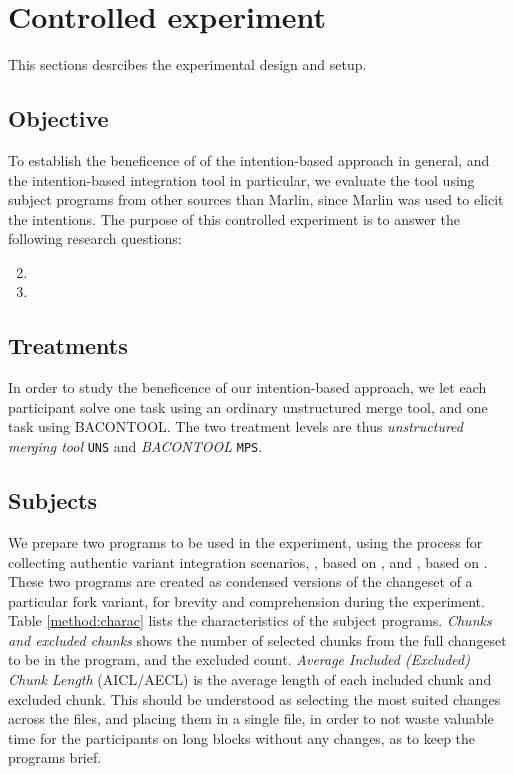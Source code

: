 \section{Controlled experiment}
This sections desrcibes the experimental design and setup.

\subsection{Objective}
To establish the beneficence of of the intention-based approach in general, and the intention-based integration tool in particular, we evaluate the tool using subject programs from other sources than Marlin, since Marlin was used to elicit the intentions. The purpose of this controlled experiment is to answer the following research questions:
\begin{enumerate}[label={Q\arabic*}]
    \setcounter{enumi}{1}
    \item \RQB
    \item \RQC
\end{enumerate}

\subsection{Treatments}
In order to study the beneficence of our intention-based approach, we let each participant solve one task using an ordinary unstructured merge tool, and one task using BACONTOOL. The two treatment levels are thus \textit{unstructured merging tool} \texttt{UNS} and \textit{BACONTOOL} \texttt{MPS}.

\subsection{Subjects}
We prepare two programs to be used in the experiment, using the process for collecting authentic variant integration scenarios, \po, based on \busybox, and \pt, based on \vim. These two programs are created as condensed versions of the changeset of a particular fork variant, for brevity and comprehension during the experiment. Table \ref{method:charac} lists the characteristics of the subject programs. \textit{Chunks and excluded chunks} shows the number of selected chunks from the full changeset to be in the program, and the excluded count. \textit{Average Included (Excluded) Chunk Length} (AICL/AECL) is the average length of each included chunk and excluded chunk. This should be understood as selecting the most suited changes across the files, and placing them in a single file, in order to not waste valuable time for the participants on long blocks without any changes, as to keep the programs brief.

